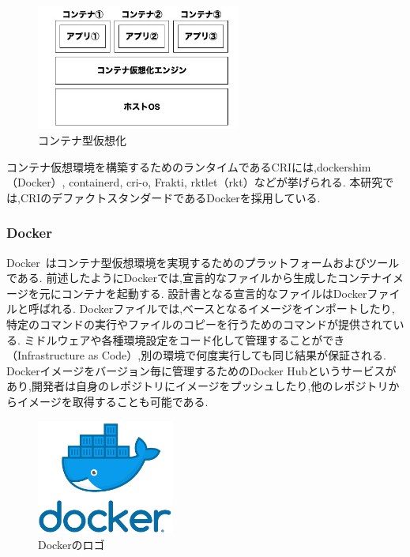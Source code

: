 \begin{figure}[htbp]
\begin{center}
    \includegraphics[width=0.6\textwidth]{./figures/docker-structure.jpg}
    \caption{コンテナ型仮想化}
\end{center}
\end{figure}

コンテナ仮想環境を構築するためのランタイムであるCRIには,dockershim（Docker）, containerd, cri-o, Frakti, rktlet（rkt）などが挙げられる.
本研究では,CRIのデファクトスタンダードであるDockerを採用している.

\subsubsection{Docker}
\label{background:container-orchestration-system:container:docker}

Docker~\cite{Docker}はコンテナ型仮想環境を実現するためのプラットフォームおよびツールである.
前述したようにDockerでは,宣言的なファイルから生成したコンテナイメージを元にコンテナを起動する.
設計書となる宣言的なファイルはDockerファイルと呼ばれる.
Dockerファイルでは,ベースとなるイメージをインポートしたり,特定のコマンドの実行やファイルのコピーを行うためのコマンドが提供されている.
ミドルウェアや各種環境設定をコード化して管理することができ（Infrastructure as Code）,別の環境で何度実行しても同じ結果が保証される.
Dockerイメージをバージョン毎に管理するためのDocker Hubというサービスがあり,開発者は自身のレポジトリにイメージをプッシュしたり,他のレポジトリからイメージを取得することも可能である.

\begin{figure}[htbp]
\begin{center}
    \includegraphics[width=0.4\textwidth]{./figures/docker-logo.png}
    \caption{Dockerのロゴ}
\end{center}
\end{figure}


